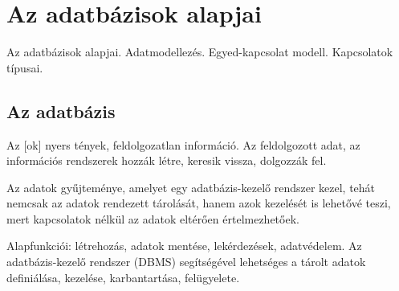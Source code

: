 \documentclass[../../main.tex]{subfiles}
\begin{document}
\section{Az adatbázisok alapjai}

\begin{fulltheorem}
  Az adatbázisok alapjai. Adatmodellezés. Egyed-kapcsolat modell. Kapcsolatok típusai.
\end{fulltheorem}

\subsection{Az adatbázis}

Az [ok] nyers tények, feldolgozatlan információ. Az
 feldolgozott adat, az információs rendszerek hozzák létre,
keresik vissza, dolgozzák fel.

Az  adatok gyűjteménye, amelyet egy adatbázis-kezelő rendszer
kezel, tehát nemcsak az adatok rendezett tárolását, hanem azok kezelését is
lehetővé teszi, mert kapcsolatok nélkül az adatok eltérően értelmezhetőek.

Alapfunkciói: létrehozás, adatok mentése, lekérdezések, adatvédelem.
Az adatbázis-kezelő rendszer (DBMS) segítségével lehetséges a tárolt
adatok definiálása, kezelése, karbantartása, felügyelete.
\end{document}
